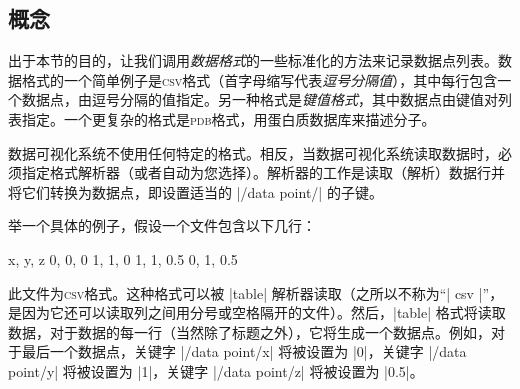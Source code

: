\subsection{概念}


出于本节的目的，让我们调用\emph{数据格式}的一些标准化的方法来记录数据点列表。数据格式的一个简单例子是\textsc{csv}格式（首字母缩写代表\emph{逗号分隔值}），其中每行包含一个数据点，由逗号分隔的值指定。另一种格式是\emph{键值格式}，其中数据点由键值对列表指定。一个更复杂的格式是\textsc{pdb}格式，用蛋白质数据库来描述分子。


数据可视化系统不使用任何特定的格式。相反，当数据可视化系统读取数据时，必须指定格式解析器（或者自动为您选择）。解析器的工作是读取（解析）数据行并将它们转换为数据点，即设置适当的 |/data point/| 的子键。


举一个具体的例子，假设一个文件包含以下几行：
%
\begin{codeexample}
x, y, z
0, 0, 0
1, 1, 0
1, 1, 0.5
0, 1, 0.5
\end{codeexample}
%
%
此文件为\textsc{csv}格式。这种格式可以被 |table| 解析器读取（之所以不称为``| csv |''，是因为它还可以读取列之间用分号或空格隔开的文件）。然后，|table| 格式将读取数据，对于数据的每一行（当然除了标题之外），它将生成一个数据点。例如，对于最后一个数据点，关键字 |/data point/x| 将被设置为 |0|，关键字 |/data point/y| 将被设置为 |1|，关键字 |/data point/z| 将被设置为 |0.5|。


